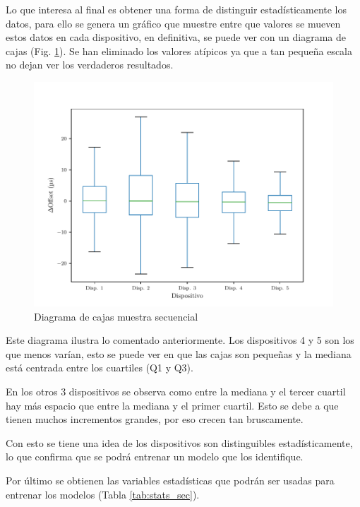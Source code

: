Lo que interesa al final es obtener una forma de distinguir estadísticamente los datos, para ello se genera un gráfico que muestre entre que valores se mueven estos datos en cada dispositivo, en definitiva, se puede ver con un diagrama de cajas (Fig. \ref{fig:box_secuencial}). Se han eliminado los valores atípicos ya que a tan pequeña escala no dejan ver los verdaderos resultados.

\begin{figure}
    \centering
    \includegraphics{../Python/plots/individual/boxplot_no_out}
    \caption{Diagrama de cajas muestra secuencial}
    \label{fig:box_secuencial}
\end{figure}

Este diagrama ilustra lo comentado anteriormente. Los dispositivos 4 y 5 son los que menos varían, esto se puede ver en que las cajas son pequeñas y la mediana está centrada entre los cuartiles (Q1 y Q3). 

En los otros 3 dispositivos se observa como entre la mediana y el tercer cuartil hay más espacio que entre la mediana y el primer cuartil. Esto se debe a que tienen muchos incrementos grandes, por eso crecen tan bruscamente.

Con esto se tiene una idea de los dispositivos son distinguibles estadísticamente, lo que confirma que se podrá entrenar un modelo que los identifique.

\iffalse
Por último se obtienen las variables estadísticas que podrán ser usadas para entrenar los modelos (Tabla \ref{tab:stats_sec}). 

